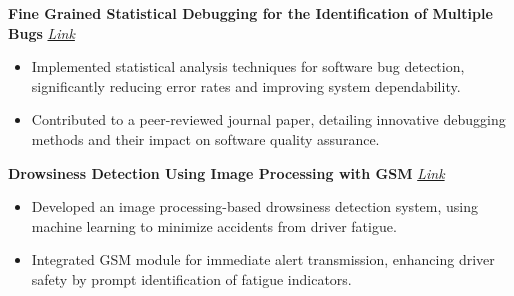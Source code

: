 \documentclass{article}
\begin{document}
\noindent \textbf{Fine Grained Statistical Debugging for the Identification of Multiple Bugs}
\textit{\href{https://www.ijert.org/fine-grained-statistical-debugging-for-the-identification-of-multiple-bugs}{Link}}
\begin{itemize}[noitemsep,nolistsep,leftmargin=*]
\item {\small Implemented statistical analysis techniques for software bug detection, significantly reducing error rates and improving system dependability.}
\item {\small Contributed to a peer-reviewed journal paper, detailing innovative debugging methods and their impact on software quality assurance.}\\
\end{itemize}
\noindent \textbf{Drowsiness Detection Using Image Processing with GSM}
\textit{\href{https://www.irjet.net/archives/V8/i5/IRJET-V8I5773.pdf}{Link}}
\begin{itemize}[noitemsep,nolistsep,leftmargin=*]
\item {\small Developed an image processing-based drowsiness detection system, using machine learning to minimize accidents from driver fatigue.}
\item {\small Integrated GSM module for immediate alert transmission, enhancing driver safety by prompt identification of fatigue indicators.}\\
\end{itemize}


\end{document}
